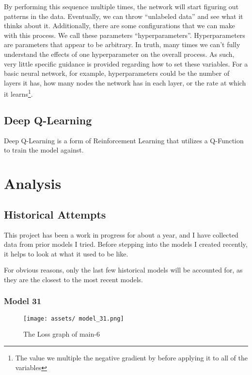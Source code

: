 \documentclass[12pt]{article}
\begin{document}
By performing this sequence multiple times, the network will start figuring out patterns in the data. Eventually, we can throw ``unlabeled data'' and see what it thinks about it. Additionally, there are some configurations that we can make with this process. We call these parameters ``hyperparameters''. Hyperparameters are parameters that appear to be arbitrary. In truth, many times we can't fully understand the effects of one hyperparameter on the overall process. As such, very little specific guidance is provided regarding how to set these variables. For a basic neural network, for example, hyperparameters could be the number of layers it has, how many nodes the network has in each layer, or the rate at which it learns\footnote{The value we multiple the negative gradient by before applying it to all of the variables}.

\subsection{Deep Q-Learning}


Deep Q-Learning is a form of Reinforcement Learning that utilizes a Q-Function to train the model against. 

\newpage

\section{Analysis}


\subsection{Historical Attempts}

This project has been a work in progress for about a year, and I have collected data from prior models I tried. Before stepping into the models I created recently, it helps to look at what it used to be like.

For obvious reasons, only the last few historical models will be accounted for, as they are the closest to the most recent models.

\subsubsection{Model 31}

\begin{figure}[h]
	\centering
	\texttt{[image: assets/ model\_31.png]}
	\caption{The Loss graph of main-6}
\end{figure}
\end{document}
